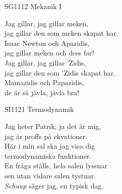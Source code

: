 \documentclass[a6paper,10pt]{article}
\begin{document}
\setlength{\oddsidemargin}{-0.37in}
\noindent
\begin{center}
\footnotesize SG1112 Mekanik I\\
\end{center}
\begin{lyrics}
Jag gillar, jag gillar meken, \\
jag gillar den som meken skapat har. \\
Isaac Newton och Apazidis, \\
jag gillar meken och dess far!
\vspace{5pt} \\
Jag gillar, jag gillar 'Zidis, \\
jag gillar den som 'Zidis skapat har. \\
Mamazidis och Papazidis, \\
de är så jävla, jävla bra!
\end{lyrics}

\vspace{20pt}
\begin{center}
\footnotesize SI1121 Termodynamik\\
\end{center}
\begin{lyrics}
Jag heter Patrik, ja det är mig, \\
jag är proffs på ekvationer. \\
Här i min sal ska jag visa dig \\
termodynamiska funktioner. \\
En fråga ställs, hela salen lyssnar \\
sen utan vidare salen tystnar. \\
\textit{Schuup} säger jag, en typisk dag. 
\end{lyrics}
\end{document}
